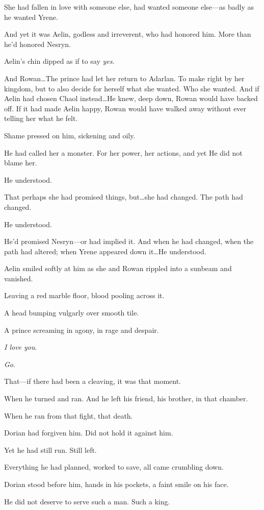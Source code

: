 She had fallen in love with someone else, had wanted someone else---as badly as he wanted Yrene.

And yet it was Aelin, godless and irreverent, who had honored him.
More than he'd honored Nesryn.

Aelin's chin dipped as if to say \emph{yes}.

And Rowan\ldots The prince had let her return to Adarlan.
To make right by her kingdom, but to also decide for herself what she wanted.
Who she wanted.
And if Aelin had chosen Chaol instead\ldots He knew, deep down, Rowan would have backed off.
If it had made Aelin happy, Rowan would have walked away without ever telling her what he felt.

Shame pressed on him, sickening and oily.

He had called her a monster.
For her power, her actions, and yet  He did not blame her.

He understood.

That perhaps she had promised things, but\ldots she had changed.
The path had changed.

He understood.

He'd promised Nesryn---or had implied it.
And when he had changed, when the path had altered; when Yrene appeared down it\ldots He understood.

Aelin smiled softly at him as she and Rowan rippled into a sunbeam and vanished.

Leaving a red marble floor, blood pooling across it.

A head bumping vulgarly over smooth tile.

A prince screaming in agony, in rage and despair.

\emph{I love you}.

\emph{Go}.

That---if there had been a cleaving, it was that moment.

When he turned and ran.
And he left his friend, his brother, in that chamber.

When he ran from that fight, that death.

Dorian had forgiven him.
Did not hold it against him.

Yet he had still run.
Still left.

Everything he had planned, worked to save, all came crumbling down.

Dorian stood before him, hands in his pockets, a faint smile on his face.

He did not deserve to serve such a man.
Such a king.

